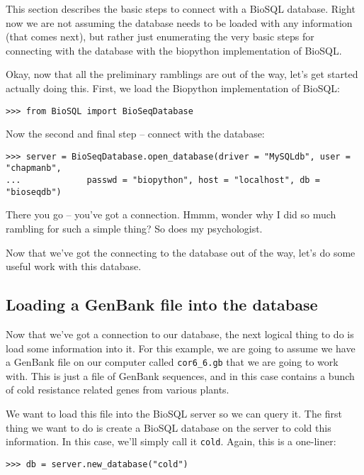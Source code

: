 \documentclass{article}
\begin{document}
This section describes the basic steps to connect with a BioSQL
database. Right now we are not assuming the database needs to be loaded
with any information (that comes next), but rather just enumerating the 
very basic steps for connecting with the database with the biopython
implementation of BioSQL.


Okay, now that all the preliminary ramblings are out of the way, let's
get started actually doing this. First, we load the Biopython
implementation of BioSQL:

\begin{verbatim}
>>> from BioSQL import BioSeqDatabase
\end{verbatim}

Now the second and final step -- connect with the database:

\begin{verbatim}
>>> server = BioSeqDatabase.open_database(driver = "MySQLdb", user = "chapmanb",
...             passwd = "biopython", host = "localhost", db = "bioseqdb")
\end{verbatim}

There you go -- you've got a connection. Hmmm, wonder why I did so much
rambling for such a simple thing? So does my psychologist.


Now that we've got the connecting to the database out of the way, let's
do some useful work with this database.

\subsection{Loading a GenBank file into the database}

Now that we've got a connection to our database, the next logical thing
to do is load some information into it. For this example, we are going
to assume we have a GenBank file on our computer called
\verb|cor6_6.gb| that we are going to work with. This is just a file of
GenBank sequences, and in this case contains a bunch of cold resistance
related genes from various plants. 


We want to load this file into the BioSQL server so we can query it.
The first thing we want to do is create a BioSQL database on the server
to cold this information. In this case, we'll simply call it
\verb|cold|. Again, this is a one-liner:

\begin{verbatim}
>>> db = server.new_database("cold")
\end{verbatim}
\end{document}
